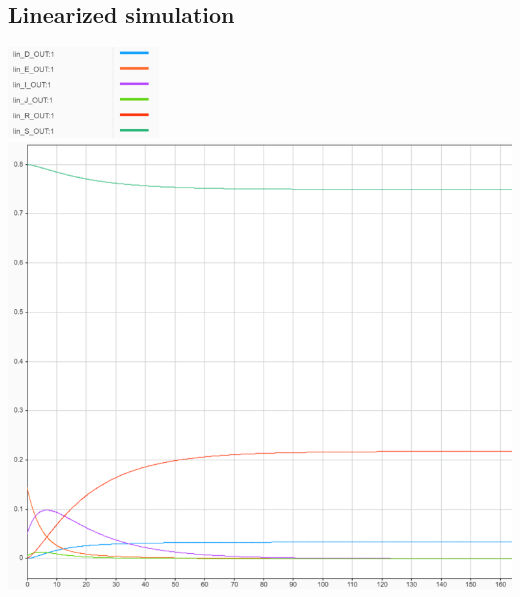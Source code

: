 \documentclass[fleqn]{article}
\begin{document}
\subsection*{Linearized simulation}
\begin{center}
    \includegraphics[width=4cm]{linear_outbreak_legend} \\
    \includegraphics[width=0.85\linewidth]{linear_outbreak_graph}
\end{center}

\newpage
\end{document}
